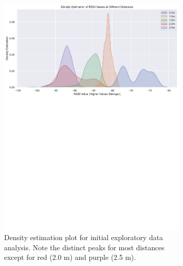 \documentclass{l4proj}
\begin{document}
\begin{figure}[!htb]
    \centering
    \begin{subfigure}[b]{0.40\textwidth}
        \includegraphics[width=\textwidth]{images/initial_rssi_density.pdf}
        \caption{Density estimation plot for initial exploratory data analysis. Note the distinct peaks for most distances except for red (2.0 m) and purple (2.5 m).}
        \label{fig:initial_density}
    \end{subfigure}
    ~
    \begin{subfigure}[b]{0.40\textwidth}

\end{subfigure}
\end{figure}
\end{document}
